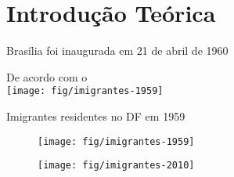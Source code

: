 \chapter{Introdução Teórica}

Brasília foi inaugurada em 21 de abril de 1960

De acordo com o  \\

\texttt{[image: fig/imigrantes-1959]}
\caption{Imigrantes residentes no DF em 1959}
\label{fig:imigrantes-1959}

\begin{figure}
    \centering
    \texttt{[image: fig/imigrantes-1959]}
    \caption{}
\end{figure}

\begin{figure}
    \centering
    \texttt{[image: fig/imigrantes-2010]}
    \caption{}
    \label{fig:imigrantes-2010}
\end{figure}
